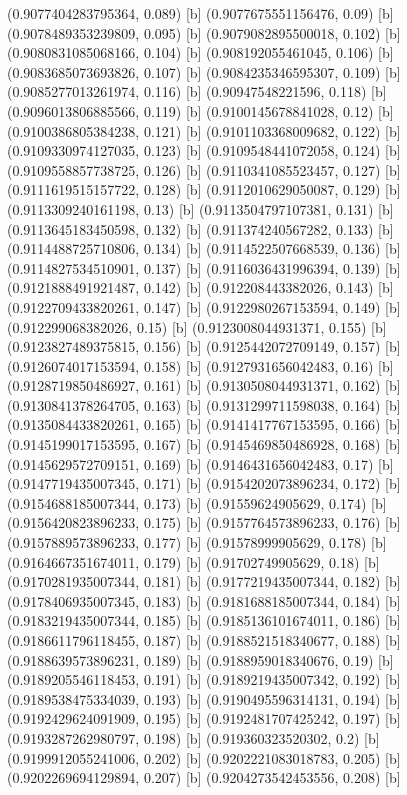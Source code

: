 {{{(0.9077404283795364, 0.089) [b] 
(0.9077675551156476, 0.09) [b] 
(0.9078489353239809, 0.095) [b] 
(0.9079082895500018, 0.102) [b] 
(0.9080831085068166, 0.104) [b] 
(0.908192055461045, 0.106) [b] 
(0.9083685073693826, 0.107) [b] 
(0.9084235346595307, 0.109) [b] 
(0.9085277013261974, 0.116) [b] 
(0.90947548221596, 0.118) [b] 
(0.9096013806885566, 0.119) [b] 
(0.9100145678841028, 0.12) [b] 
(0.9100386805384238, 0.121) [b] 
(0.9101103368009682, 0.122) [b] 
(0.9109330974127035, 0.123) [b] 
(0.9109548441072058, 0.124) [b] 
(0.9109558857738725, 0.126) [b] 
(0.9110341085523457, 0.127) [b] 
(0.9111619515157722, 0.128) [b] 
(0.9112010629050087, 0.129) [b] 
(0.9113309240161198, 0.13) [b] 
(0.9113504797107381, 0.131) [b] 
(0.9113645183450598, 0.132) [b] 
(0.911374240567282, 0.133) [b] 
(0.9114488725710806, 0.134) [b] 
(0.9114522507668539, 0.136) [b] 
(0.9114827534510901, 0.137) [b] 
(0.9116036431996394, 0.139) [b] 
(0.9121888491921487, 0.142) [b] 
(0.912208443382026, 0.143) [b] 
(0.9122709433820261, 0.147) [b] 
(0.9122980267153594, 0.149) [b] 
(0.912299068382026, 0.15) [b] 
(0.9123008044931371, 0.155) [b] 
(0.9123827489375815, 0.156) [b] 
(0.9125442072709149, 0.157) [b] 
(0.9126074017153594, 0.158) [b] 
(0.9127931656042483, 0.16) [b] 
(0.9128719850486927, 0.161) [b] 
(0.9130508044931371, 0.162) [b] 
(0.9130841378264705, 0.163) [b] 
(0.9131299711598038, 0.164) [b] 
(0.9135084433820261, 0.165) [b] 
(0.9141417767153595, 0.166) [b] 
(0.9145199017153595, 0.167) [b] 
(0.9145469850486928, 0.168) [b] 
(0.9145629572709151, 0.169) [b] 
(0.9146431656042483, 0.17) [b] 
(0.9147719435007345, 0.171) [b] 
(0.9154202073896234, 0.172) [b] 
(0.9154688185007344, 0.173) [b] 
(0.91559624905629, 0.174) [b] 
(0.9156420823896233, 0.175) [b] 
(0.9157764573896233, 0.176) [b] 
(0.9157889573896233, 0.177) [b] 
(0.91578999905629, 0.178) [b] 
(0.9164667351674011, 0.179) [b] 
(0.91702749905629, 0.18) [b] 
(0.9170281935007344, 0.181) [b] 
(0.9177219435007344, 0.182) [b] 
(0.9178406935007345, 0.183) [b] 
(0.9181688185007344, 0.184) [b] 
(0.9183219435007344, 0.185) [b] 
(0.9185136101674011, 0.186) [b] 
(0.9186611796118455, 0.187) [b] 
(0.9188521518340677, 0.188) [b] 
(0.9188639573896231, 0.189) [b] 
(0.9188959018340676, 0.19) [b] 
(0.9189205546118453, 0.191) [b] 
(0.9189219435007342, 0.192) [b] 
(0.9189538475334039, 0.193) [b] 
(0.9190495596314131, 0.194) [b] 
(0.9192429624091909, 0.195) [b] 
(0.9192481707425242, 0.197) [b] 
(0.9193287262980797, 0.198) [b] 
(0.919360323520302, 0.2) [b] 
(0.9199912055241006, 0.202) [b] 
(0.9202221083018783, 0.205) [b] 
(0.9202269694129894, 0.207) [b] 
(0.9204273542453556, 0.208) [b] 
}}}
